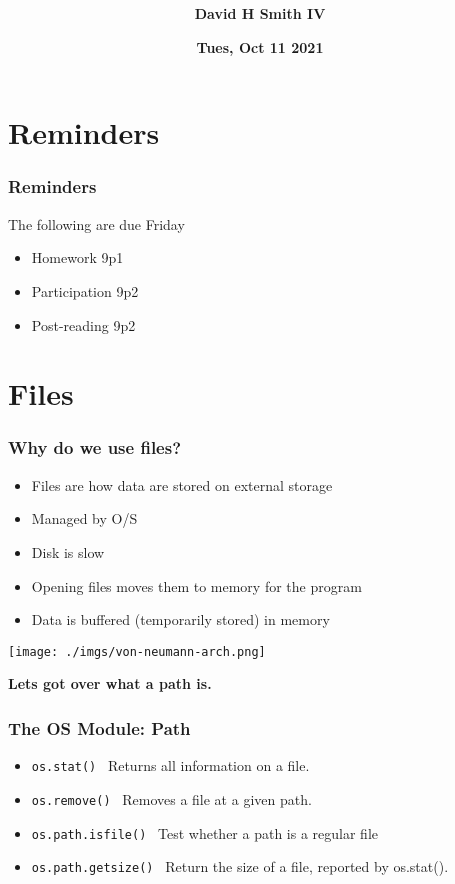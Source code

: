 \documentclass{beamer}
\title{\textbf{}}
\author{\textbf{David H Smith IV}}
\institute[\textbf{UIUC}]{\textbf{University of Illinois Urbana-Champaign}}
\date{\textbf{Tues, Oct 11 2021}}
\begin{document}
\frame{\titlepage}

\section{Reminders}

%
%
\begin{frame}
  \frametitle{Reminders}
  The following are due Friday
  \begin{itemize}
    \item Homework 9p1
    \item Participation 9p2
    \item Post-reading 9p2
  \end{itemize}
\end{frame}

\section{Files}
%
%
\begin{frame}[fragile]
  \frametitle{Why do we use files?}
  \begin{minipage}{0.48\textwidth}
    \begin{itemize}
      \item Files are how data are stored on external storage
      \item Managed by O/S
      \item Disk is slow
      \item Opening files moves them to memory for the program
      \item Data is buffered (temporarily stored) in memory
    \end{itemize}
  \end{minipage}
  \hfill
  \begin{minipage}{0.48\textwidth}
    \centering
    \texttt{[image: ./imgs/von-neumann-arch.png]}
    \vfill
  \end{minipage}
  \pause
  \vfill
  \textbf{Lets got over what a path is.}
\end{frame}

\begin{frame}[fragile]
  \frametitle{The OS Module: Path}
  \begin{itemize}
    \item \lstinline|os.stat()| \textrightarrow \ Returns all information on a file.
    \item \lstinline|os.remove()| \textrightarrow \ Removes a file at a given path.
    \item \lstinline|os.path.isfile()| \textrightarrow \ Test whether a path is a regular file
    \item \lstinline|os.path.getsize()| \textrightarrow \ Return the size of a file, reported by os.stat().
  \end{itemize}
\end{frame}
\end{document}
